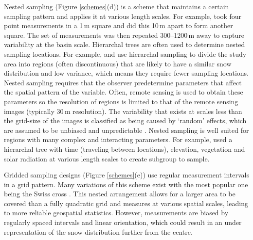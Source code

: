 \documentclass{sfuthesis}
\begin{document}
Nested sampling (Figure \ref{schemes}(d)) is a scheme that maintains a certain sampling pattern and applies it at various length scales. For example, \cite{Schweizer2008} took four point measurements in a 1\,m square and did this 10\,m apart to form another square. The set of measurements was then repeated 300--1200\,m away to capture variability at the basin scale. Hierarchal trees are often used to determine nested sampling locations. For example, \cite{Watson2006} and \cite{Kasurak2011} use hierarchal sampling to divide the study area into regions (often discontinuous) that are likely to have a similar snow distribution and low variance, which means they require fewer sampling locations. Nested sampling requires that the observer predetermine parameters that affect the spatial pattern of the variable. Often, remote sensing is used to obtain these parameters so the resolution of regions is limited to that of the remote sensing images (typically 30\,m resolution). The variability that exists at scales less than the grid-size of the images is classified as being caused by `random' effects, which are assumed to be unbiased and unpredictable \citep{Watson2006}. Nested sampling is well suited for regions with many complex and interacting parameters. For example, \cite{Watson2006} used a hierarchal tree with time (traveling between locations), elevation, vegetation and solar radiation at various length scales to create subgroup to sample. 

Gridded sampling designs (Figure \ref{schemes}(e)) use regular measurement intervals in a grid pattern. Many variations of this scheme exist \citep{Molotch2005a, Kronholm2007, Lopez2011} with the most popular one being the Swiss cross \citep{Kronholm2004}. This nested arrangement allows for a larger area to be covered than a fully quadratic grid and measures at various spatial scales, leading to more reliable geospatial statistics. However, measurements are biased by regularly spaced intervals and linear orientation, which could result in an under representation of the snow distribution further from the centre. 
\end{document}
